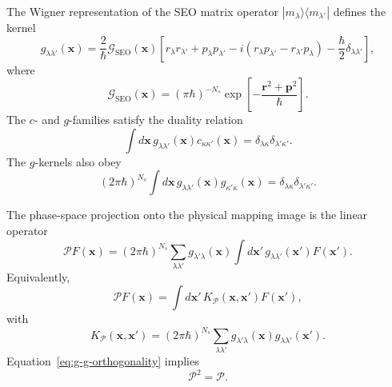 \documentclass[
  11pt,
  letterpaper,
  onehalfspacing,
  normalmargins,
  equalmargins,
  oneside
]{ut-thesis}
\begin{document}
The Wigner representation of the SEO matrix operator
\(|m_\lambda\rangle\langle m_{\lambda'}|\) defines the kernel
\begin{equation}
g_{\lambda\lambda'}(\mathbf x)
=
\frac{2}{\hbar}
\mathcal G_{\mathrm{SEO}}(\mathbf x)
\left[
 r_\lambda r_{\lambda'}
+
 p_\lambda p_{\lambda'}
-
 i\left(
 r_\lambda p_{\lambda'}
-
 r_{\lambda'}p_\lambda
\right)
-
\frac{\hbar}{2}\delta_{\lambda\lambda'}
\right],
\label{eq:mapping-g-kernel}
\end{equation}
where
\begin{equation}
\mathcal G_{\mathrm{SEO}}(\mathbf x)
=
(\pi\hbar)^{-N_s}
\exp\left[-\frac{\mathbf r^2+\mathbf p^2}{\hbar}\right].
\label{eq:mapping-gaussian-factor}
\end{equation}
The \(c\)- and \(g\)-families satisfy the duality relation
\begin{equation}
\int d\mathbf x\,
 g_{\lambda\lambda'}(\mathbf x)
 c_{\kappa\kappa'}(\mathbf x)
=
\delta_{\lambda\kappa}
\delta_{\lambda'\kappa'}.
\label{eq:c-g-biorthogonality}
\end{equation}
The \(g\)-kernels also obey
\begin{equation}
(2\pi\hbar)^{N_s}
\int d\mathbf x\,
 g_{\lambda\lambda'}(\mathbf x)
 g_{\kappa'\kappa}(\mathbf x)
=
\delta_{\lambda\kappa}
\delta_{\lambda'\kappa'}.
\label{eq:g-g-orthogonality}
\end{equation}

The phase-space projection onto the physical mapping image is the linear
operator
\begin{equation}
\mathcal P F(\mathbf x)
=
(2\pi\hbar)^{N_s}
\sum_{\lambda\lambda'}
 g_{\lambda'\lambda}(\mathbf x)
\int d\mathbf x'\,
 g_{\lambda\lambda'}(\mathbf x')
 F(\mathbf x').
\label{eq:seo-phase-space-projector}
\end{equation}
Equivalently,
\begin{equation}
\mathcal P F(\mathbf x)
=
\int d\mathbf x'\,
K_{\mathcal P}(\mathbf x,\mathbf x')F(\mathbf x'),
\label{eq:projected-mapping-density}
\end{equation}
with
\begin{equation}
K_{\mathcal P}(\mathbf x,\mathbf x')
=
(2\pi\hbar)^{N_s}
\sum_{\lambda\lambda'}
 g_{\lambda'\lambda}(\mathbf x)
 g_{\lambda\lambda'}(\mathbf x').
\label{eq:seo-projection-kernel}
\end{equation}
Equation~\eqref{eq:g-g-orthogonality} implies
\begin{equation}
\mathcal P^2=\mathcal P.
\label{eq:seo-projector-idempotence}
\end{equation}
\end{document}
